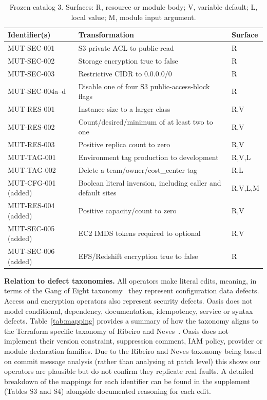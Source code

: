 \documentclass[3p,times,procedia]{elsarticle}
\begin{document}
\begin{table}[ht]
\caption{Frozen catalog 3. Surfaces: R, resource or module body; V, variable default; L, local value; M, module input argument.}\label{tab:operators}
\small\begin{tabularx}{\linewidth}{@{}p{3.05cm}Xp{1.4cm}@{}}\toprule
Identifier(s) & Transformation & Surface\\\midrule
MUT-SEC-001 & S3 private ACL to public-read & R\\
MUT-SEC-002 & Storage encryption true to false & R\\
MUT-SEC-003 & Restrictive CIDR to 0.0.0.0/0 & R\\
MUT-SEC-004a--d & Disable one of four S3 public-access-block flags & R\\
MUT-RES-001 & Instance size to a larger class & R,V\\
MUT-RES-002 & Count/desired/minimum of at least two to one & R,V\\
MUT-RES-003 & Positive replica count to zero & R,V\\
MUT-TAG-001 & Environment tag production to development & R,V,L\\
MUT-TAG-002 & Delete a team/owner/cost\_center tag & R,L\\\midrule
MUT-CFG-001 (added) & Boolean literal inversion, including caller and default sites & R,V,L,M\\
MUT-RES-004 (added) & Positive capacity/count to zero & R,V\\
MUT-SEC-005 (added) & EC2 IMDS tokens required to optional & R,V\\
MUT-SEC-006 (added) & EFS/Redshift encryption true to false & R\\\bottomrule
\end{tabularx}\end{table}

\textbf{Relation to defect taxonomies.} All operators make literal edits, meaning, in terms of the Gang of Eight taxonomy~\cite{gangofeight} they represent configuration data defects. Access and encryption operators also represent security defects. Oasis does not model conditional, dependency, documentation, idempotency, service or syntax defects. Table~\ref{tab:mapping} provides a summary of how the taxonomy aligns to the Terraform specific taxonomy of Ribeiro and Neves~\cite{ribeiro}. Oasis does not implement their version constraint, suppression comment, IAM policy, provider or module declaration families. Due to the Ribeiro and Neves taxonomy being based on commit message analysis (rather than analysing at patch level) this shows our operators are plausible but do not confirm they replicate real faults. A detailed breakdown of the mappings for each identifier can be found in the supplement (Tables S3 and S4) alongside documented reasoning for each edit.
\end{document}
